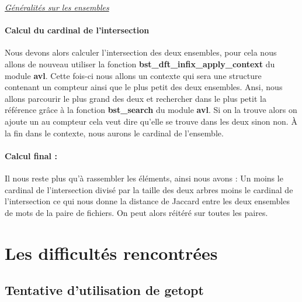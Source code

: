 \documentclass{article}
\begin{document}
\begin{center}
\end{center}
\begin{center}
  \colorbox{lightgray!20}{\textit{\underline{Généralités sur les ensembles}}}
\end{center}

\paragraph{Calcul du cardinal de l'intersection}
Nous devons alors calculer l'intersection des deux ensembles, pour cela nous allons de nouveau
utiliser la fonction \textbf{bst\_dft\_infix\_apply\_context} du module \textbf{avl}. Cette fois-ci 
nous allons un contexte qui sera une structure contenant un compteur ainsi que le plus petit des deux 
ensembles. Ansi, nous allons parcourir le plus grand des deux et rechercher dans le plus petit la référence 
grâce à la fonction \textbf{bst\_search} du module \textbf{avl}. Si on la trouve alors on ajoute un au compteur
cela veut dire qu'elle se trouve dans les deux sinon non. À la fin dans le contexte, nous aurons le cardinal de l'ensemble.

\paragraph{Calcul final :}
Il nous reste plus qu'à rassembler les éléments, ainsi nous avons :
Un moins le cardinal de l'intersection divisé par la taille des deux arbres moins le cardinal de l'intersection ce qui nous donne
la distance de Jaccard entre les deux ensembles de mots de la paire de fichiers. On peut alors réitéré sur toutes les paires.

\section{Les difficultés rencontrées}

\subsection{Tentative d'utilisation de getopt}
\end{document}
